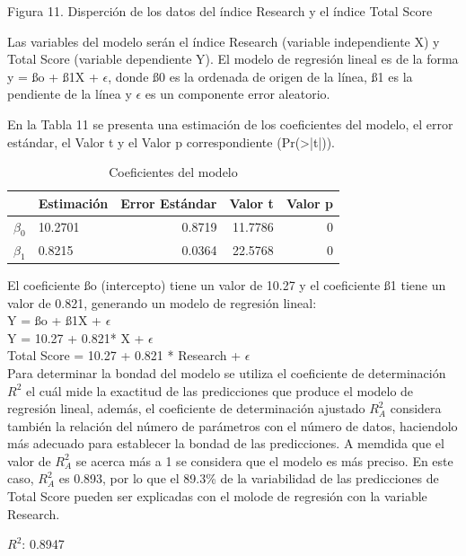 \documentclass[
]{article}
\begin{document}
\begin{multicols}{2}
Figura 11. Disperción de los datos del índice Research y el índice Total Score

Las variables del modelo serán el índice Research (variable independiente X) y Total Score (variable dependiente Y). El modelo de regresión lineal es de la forma y = ßo + ß1X + $\epsilon$, donde ß0 es la ordenada de origen de la línea, ß1 es la pendiente de la línea y $\epsilon$ es un componente error aleatorio.



En la Tabla 11 se presenta una estimación de los coeficientes del modelo, el error estándar, el Valor t y el Valor p correspondiente (Pr(>|t|)). 

\begin{table}[H]
\centering
\caption{\label{tab:tabla11}Coeficientes del modelo}
\centering
\fontsize{9}{11}\selectfont
\begin{tabular}[t]{llrrr}
\toprule
  & Estimación & Error Estándar & Valor t & Valor p\\
\midrule
$\beta_0$ & 10.2701 & 0.8719 & 11.7786 & 0\\
$\beta_1$ & 0.8215 & 0.0364 & 22.5768 & 0\\
\bottomrule
\end{tabular}
\end{table}

El coeficiente ßo (intercepto) tiene un valor de  10.27 y el coeficiente ß1 tiene un valor de 0.821, generando un modelo de regresión lineal:\\

Y = ßo + ß1X + $\epsilon$\\
Y = 10.27 + 0.821* X + $\epsilon$\\
Total Score = 10.27 + 0.821 * Research + $\epsilon$\\

Para determinar la bondad del modelo se utiliza el coeficiente de determinación $R^2$ el cuál mide la exactitud de las predicciones que produce el modelo de regresión lineal, además, el coeficiente de determinación ajustado $R^2_{A}$ considera también la relación del número de parámetros con el número de datos, haciendolo más adecuado para establecer la bondad de las predicciones. A memdida que el valor de $R^2_{A}$ se acerca más a 1 se considera que el modelo es más preciso. En este caso, $R^2_{A}$ es 0.893, por lo que el 89.3\% de la variabilidad de las predicciones de Total Score pueden ser explicadas con el molode de regresión con la variable Research.

$R^2$:  0.8947 


\end{multicols}
\end{document}
